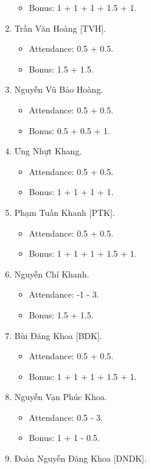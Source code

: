 \documentclass{article}
\begin{document}
\begin{enumerate}
\begin{itemize}
        \item Bonus: 1 + 1 + 1 + 1.5 + 1.
    \end{itemize}
    \item {\sc Trần Văn Hoàng [TVH].}
    \begin{itemize}
        \item Attendance: 0.5 + 0.5.
        \item Bonus: 1.5 + 1.5.
    \end{itemize}
    \item {\sc Nguyễn Vũ Bảo Hoàng.}
    \begin{itemize}
        \item Attendance: 0.5 + 0.5.
        \item Bonus: 0.5 + 0.5 + 1.
    \end{itemize}
    \item {\sc Ưng Nhựt Khang.}
    \begin{itemize}
        \item Attendance: 0.5 + 0.5.
        \item Bonus: 1 + 1 + 1 + 1.
    \end{itemize}
    \item {\sc Phạm Tuấn Khanh [PTK].}
    \begin{itemize}
        \item Attendance: 0.5 + 0.5.
        \item Bonus: 1 + 1 + 1 + 1.5 + 1.
    \end{itemize}
    \item {\sc Nguyễn Chí Khanh.}
    \begin{itemize}
        \item Attendance: -1 - 3.
        \item Bonus: 1.5 + 1.5.
    \end{itemize}
    \item {\sc Bùi Đăng Khoa [BDK].}
    \begin{itemize}
        \item Attendance: 0.5 + 0.5.
        \item Bonus: 1 + 1 + 1 + 1.5 + 1.
    \end{itemize}
    \item {\sc Nguyễn Vạn Phúc Khoa.}
    \begin{itemize}
        \item Attendance: 0.5 - 3.
        \item Bonus: 1 + 1 - 0.5.
    \end{itemize}
    \item {\sc Đoàn Nguyễn Đăng Khoa [DNDK].}

\end{enumerate}
\end{document}
